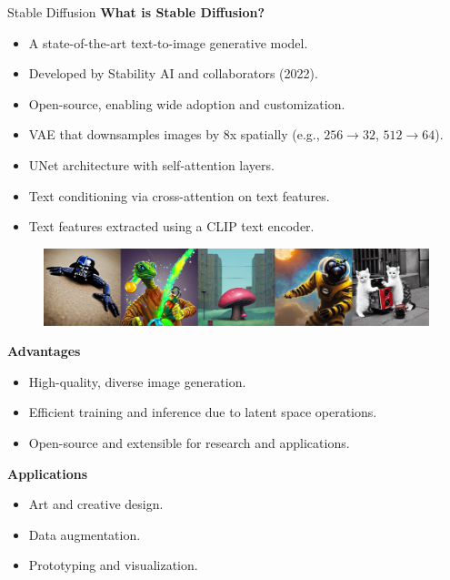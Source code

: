\begin{frame}[allowframebreaks]{Stable Diffusion}
    \textbf{What is Stable Diffusion?}
    \begin{itemize}
        \item A state-of-the-art text-to-image generative model.
        \item Developed by Stability AI and collaborators (2022).
        \item Open-source, enabling wide adoption and customization.
    \end{itemize}

    \framebreak

    \begin{itemize}
        \item VAE that downsamples images by 8x spatially (e.g., $256 \rightarrow 32$, $512 \rightarrow 64$).
        \item UNet architecture with self-attention layers.
        \item Text conditioning via cross-attention on text features.
        \item Text features extracted using a CLIP text encoder.
    \end{itemize}
    \vspace{1em}
    \begin{figure}
        \centering
        \includegraphics[width=1.06\linewidth,height=\textheight,keepaspectratio]{images/adv-img-gen/slide_99_1_img.png}
    \end{figure}

    \framebreak

    \textbf{Advantages}
    \begin{itemize}
        \item High-quality, diverse image generation.
        \item Efficient training and inference due to latent space operations.
        \item Open-source and extensible for research and applications.
    \end{itemize}

    \textbf{Applications}
    \begin{itemize}
        \item Art and creative design.
        \item Data augmentation.
        \item Prototyping and visualization.
    \end{itemize}


\end{frame}
